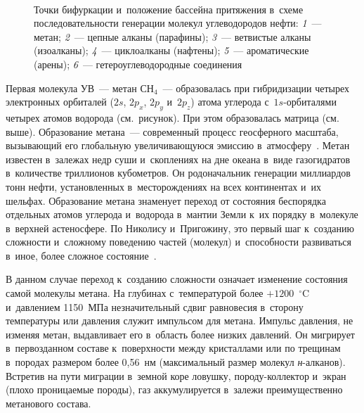 \begin{multicols}{2}
    \begin{figure*}
    \vspace*{1pt}
    \begin{center}  
  \mbox{%
 \epsfxsize=162.209mm 
 }
\end{center}

\vspace*{6pt}

\noindent
{\small Точки бифуркации и~положение бассейна притяжения в~схеме последовательности 
генерации молекул углеводородов нефти: \textit{1}~--- метан; \textit{2}~--- цепные алканы 
(парафины); \textit{3}~--- ветвистые алканы (изоалканы); \textit{4}~--- циклоалканы (нафтены); 
\textit{5}~--- ароматические (арены); \textit{6}~--- гетероуглеводородные соединения}
\end{figure*}

    Первая молекула УВ~--- метан СН$_4$~--- образовалась при гибридизации четырех 
электронных орбиталей ($2s$, $2p_x$, $2p_y$ и~$2p_z$) атома углерода с~$1s$-ор\-би\-та\-ля\-ми 
четырех атомов водорода (см.\ рисунок). При этом образовалась матрица (см. выше). 
Образование метана~--- современный процесс геосферного масштаба, 
вызывающий его глобальную увеличивающуюся эмиссию в~атмосферу~\cite{7-s}. 
Метан известен в~залежах недр суши и~скоплениях на дне океана в~виде 
газогидратов в~количестве триллионов кубометров. Он родоначальник генерации 
миллиардов тонн нефти, установленных в~месторождениях на всех континентах 
и~их шельфах. Образование метана знаменует переход от состояния беспорядка 
отдельных атомов углерода и~водорода в~мантии Земли к~их порядку в~молекуле 
в~верхней астеносфере. По Николису и~Пригожину, это первый шаг к~созданию 
сложности и~сложному поведению час\-тей (молекул) и~способности развиваться 
в~иное, более сложное состояние~\cite[с.~25--35]{8-s}. 
    
    В данном случае переход к~созданию сложности означает изменение 
состояния самой молекулы метана. На глубинах с~температурой более 
$+1200$~$^\circ$C и~давлением 1150~МПа незначительный сдвиг равновесия 
в~сторону температуры или давления служит импульсом для метана. Импульс 
давления, не изменяя метан, выдавливает его в~область более низких давлений. 
Он мигрирует в~первозданном составе к~поверхности между кристаллами или по 
трещинам в~породах размером более 0,56~нм (максимальный размер молекул  
\textit{н}-ал\-ка\-нов). Встретив на пути миграции в~земной коре ловушку,  
по\-ро\-ду-кол\-лек\-тор и~экран (плохо проницаемые породы), газ аккумулируется в~залежи преимущественно метанового состава. 
    

\end{multicols}
